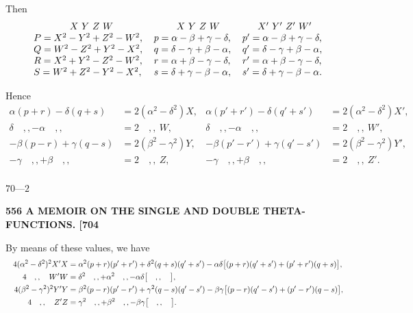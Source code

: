 \documentclass[11pt]{article}
\begin{document}
Then
{\small
\[
\begin{array}{l@{\hspace{1.2em}}l@{\hspace{1.2em}}l}
\multicolumn{1}{c}{X\ Y\ Z\ W} & \multicolumn{1}{c}{X\ Y\ Z\ W} & \multicolumn{1}{c}{X'\ Y'\ Z'\ W'}\\
P = X^2 - Y^2 + Z^2 - W^2, & p = \alpha - \beta + \gamma - \delta, & p' = \alpha - \beta + \gamma - \delta,\\
Q = W^2 - Z^2 + Y^2 - X^2, & q = \delta - \gamma + \beta - \alpha, & q' = \delta - \gamma + \beta - \alpha,\\
R = X^2 + Y^2 - Z^2 - W^2, & r = \alpha + \beta - \gamma - \delta, & r' = \alpha + \beta - \gamma - \delta,\\
S = W^2 + Z^2 - Y^2 - X^2, & s = \delta + \gamma - \beta - \alpha, & s' = \delta + \gamma - \beta - \alpha.\\
\end{array}
\]
}

Hence
\[
\begin{aligned}
\alpha(p + r) - \delta(q + s) &= 2(\alpha^2 - \delta^2)X, & \alpha(p' + r') - \delta(q' + s') &= 2(\alpha^2 - \delta^2)X',\\
\delta\quad,, - \alpha\quad,, &= 2\quad,, \ W, & \delta\quad,, - \alpha\quad,, &= 2\quad,, \ W',\\
-\beta(p - r) + \gamma(q - s) &= 2(\beta^2 - \gamma^2)Y, & -\beta(p' - r') + \gamma(q' - s') &= 2(\beta^2 - \gamma^2)Y',\\
-\gamma\quad,, + \beta\quad,, &= 2\quad,, \ Z, & -\gamma\quad,, + \beta\quad,, &= 2\quad,, \ Z'.\\
\end{aligned}
\]

\hfill $70$---$2$

\newpage
\noindent\textbf{556 \hfill A MEMOIR ON THE SINGLE AND DOUBLE THETA-FUNCTIONS. \hfill [704}

\medskip
By means of these values, we have
\[
\resizebox{\textwidth}{!}{$\displaystyle
\begin{aligned}
4(\alpha^2 - \delta^2)^2 X'X &= \alpha^2(p + r)(p' + r') + \delta^2(q + s)(q' + s') - \alpha\delta\bigl[(p+r)(q'+s') + (p'+r')(q+s)\bigr],\\
4\quad,,\quad W'W &= \delta^2\quad,, + \alpha^2\quad,, - \alpha\delta\bigl[\quad,, \quad\bigr],\\
4(\beta^2 - \gamma^2)^2 Y'Y &= \beta^2(p - r)(p' - r') + \gamma^2(q - s)(q' - s') - \beta\gamma\bigl[(p-r)(q'-s') + (p'-r')(q-s)\bigr],\\
4\quad,,\quad Z'Z &= \gamma^2\quad,, + \beta^2\quad,, - \beta\gamma\bigl[\quad,, \quad\bigr].\\
\end{aligned}
$}
\]
\end{document}
